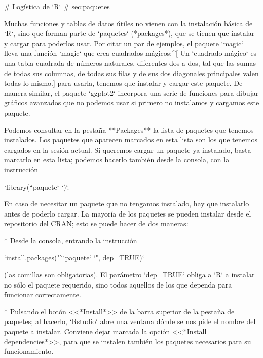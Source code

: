 
# Logística de `R` {# sec:paquetes}


 Muchas funciones y tablas de datos útiles no vienen con la instalación básica de `R`, sino que forman parte de `paquetes`  (*packages*), que se tienen que instalar y cargar para poderlos usar. 
Por citar un par de ejemplos, el paquete `magic` lleva una función `magic` que crea {cuadrados mágicos};^[ Un `cuadrado mágico`  es una tabla cuadrada de números naturales, diferentes dos a dos, tal que las sumas de todas sus columnas,  de todas sus filas y  de sus dos diagonales principales valen todas lo mismo.]  para usarla, tenemos que instalar y cargar este paquete. De manera similar,  el paquete `ggplot2` incorpora una serie  de funciones para dibujar gráficos avanzados que no podemos usar si primero no instalamos y cargamos este paquete.

Podemos consultar en la pestaña  **Packages**  la lista de paquetes que tenemos instalados. Los paquetes que aparecen marcados en esta lista son los que  tenemos  cargados en la sesión actual. Si queremos cargar un paquete ya instalado, basta marcarlo en esta lista; podemos hacerlo también desde la consola, con la instrucción

`library(``paquete` `)`.


En caso de necesitar un paquete que no tengamos instalado, hay que instalarlo antes de poderlo cargar.
La mayoría de los paquetes se pueden instalar desde el repositorio del CRAN;
esto se puede hacer de dos maneras:

* Desde la consola, entrando la instrucción

`install.packages("``paquete` `", dep=TRUE)`

(las comillas son obligatorias). El parámetro `dep=TRUE` obliga a `R` a instalar no sólo el paquete requerido, sino todos aquellos de los que dependa para funcionar correctamente. 

* Pulsando el botón <<*Install*>> de la barra superior de la pestaña de paquetes; al hacerlo, `Rstudio` abre una ventana dónde se nos pide el nombre del paquete a instalar. Conviene dejar marcada la opción <<*Install dependencies*>>, para que se instalen también los paquetes necesarios para su funcionamiento.

